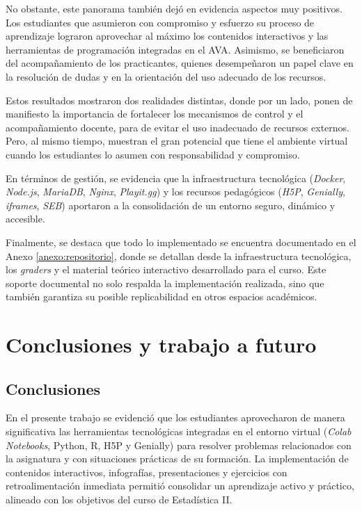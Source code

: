 \documentclass[letter,oneside,12pt,spanish]{report}
\begin{document}
No obstante, este panorama también dejó en evidencia aspectos muy positivos. Los estudiantes que asumieron con compromiso y esfuerzo su proceso de aprendizaje lograron aprovechar al máximo los contenidos interactivos y las herramientas de programación integradas en el AVA. Asimismo, se beneficiaron del acompañamiento de los practicantes, quienes desempeñaron un papel clave en la resolución de dudas y en la orientación del uso adecuado de los recursos.

Estos resultados mostraron dos realidades distintas, donde por un lado, ponen de manifiesto la importancia de fortalecer los mecanismos de control y el acompañamiento docente, para de evitar el uso inadecuado de recursos externos. Pero, al mismo tiempo, muestran el gran potencial que tiene el ambiente virtual cuando los estudiantes lo asumen con responsabilidad y compromiso.

En términos de gestión, se evidencia que la infraestructura tecnológica (\textit{Docker}, \textit{Node.js}, \textit{MariaDB}, \textit{Nginx}, \textit{Playit.gg}) y los recursos pedagógicos (\textit{H5P}, \textit{Genially}, \textit{iframes}, \textit{SEB}) aportaron a la consolidación de un entorno seguro, dinámico y accesible.

Finalmente, se destaca que todo lo implementado se encuentra documentado en el Anexo \ref{anexo:repositorio}, donde se detallan desde la infraestructura tecnológica, los \textit{graders} y el material teórico interactivo desarrollado para el curso. Este soporte documental no solo respalda la implementación realizada, sino que también garantiza su posible replicabilidad en otros espacios académicos.


\newpage

\chapter{Conclusiones y trabajo a futuro}

\section{Conclusiones}

En el presente trabajo se evidenció que los estudiantes aprovecharon de manera significativa las herramientas tecnológicas integradas en el entorno virtual (\textit{Colab Notebooks}, Python, R, H5P y Genially) para resolver problemas relacionados con la asignatura y con situaciones prácticas de su formación. La implementación de contenidos interactivos, infografías, presentaciones y ejercicios con retroalimentación inmediata permitió consolidar un aprendizaje activo y práctico, alineado con los objetivos del curso de Estadística II.
\end{document}

